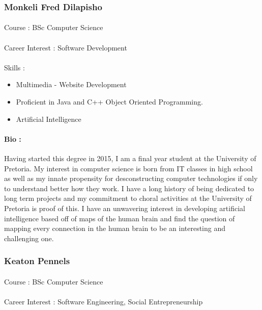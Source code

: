 \documentclass[11pt]{article}
\begin{document}
\subsubsection{Monkeli Fred Dilapisho}
\paragraph{}Course : BSc Computer Science
\paragraph{}Career Interest : Software Development
\paragraph{}Skills : 
\begin{itemize}
\item Multimedia - Website Development
\item Proficient in Java and C++ Object Oriented Programming.
\item Artificial Intelligence
\end{itemize}
\paragraph{Bio :}  Having started this degree in 2015, I am a final year student at the University of Pretoria. My interest in computer science is born from IT classes in high school as well as my innate propensity for desconstructing computer technologies if only to understand better how they work. I have a long history of being dedicated to long term projects and my commitment to choral activities at the University of Pretoria is proof of this. I have an unwavering interest in developing artificial intelligence based off of maps of the human brain and find the question of mapping every connection in the human brain to be an interesting and challenging one.

\subsubsection{Keaton Pennels}
\paragraph{}Course : BSc Computer Science 
\paragraph{}Career Interest : Software Engineering, Social Entrepreneurship
\end{document}
